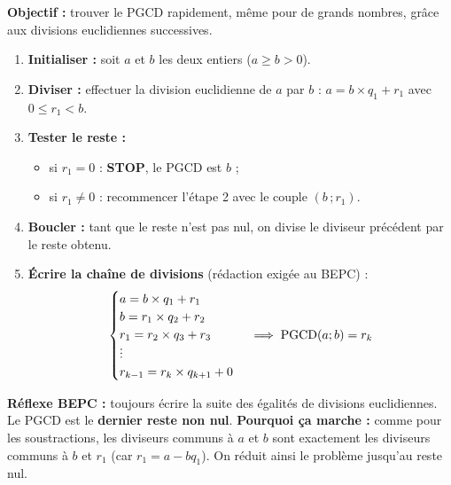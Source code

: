 \documentclass[11pt]{article}
\def\vdots{\mathord{\vbox{\baselineskip3.2pt\lineskiplimit0pt\kern4pt\hbox{.}\hbox{.}\hbox{.}}}}%
\begin{document}
\begin{methode}
\textbf{Objectif :} trouver le PGCD rapidement, même pour de grands nombres, grâce aux divisions euclidiennes successives.
\begin{enumerate}
    \item \textbf{Initialiser :} soit $a$ et $b$ les deux entiers ($a \ge b > 0$).
    \item \textbf{Diviser :} effectuer la division euclidienne de $a$ par $b$ : $a = b \times q_1 + r_1$ avec $0 \le r_1 < b$.
    \item \textbf{Tester le reste :}
    \begin{itemize}
        \item si $r_1 = 0$ : \textbf{STOP}, le PGCD est $b$ ;
        \item si $r_1 \neq 0$ : recommencer l'étape 2 avec le couple $(b \,; r_1)$.
    \end{itemize}
    \item \textbf{Boucler :} tant que le reste n'est pas nul, on divise le diviseur précédent par le reste obtenu.
    \item \textbf{Écrire la chaîne de divisions} (rédaction exigée au BEPC) :
    \[
    \begin{cases}
    a = b \times q_1 + r_1 \\
    b = r_1 \times q_2 + r_2 \\
    r_1 = r_2 \times q_3 + r_3 \\
    \vdots \\
    r_{k-1} = r_k \times q_{k+1} + 0
    \end{cases}
    \implies \text{PGCD}(a; b) = r_k
    \]
\end{enumerate}
\textbf{Réflexe BEPC :} toujours écrire la suite des égalités de divisions euclidiennes. Le PGCD est le \textbf{dernier reste non nul}.
\textbf{Pourquoi ça marche :} comme pour les soustractions, les diviseurs communs à $a$ et $b$ sont exactement les diviseurs communs à $b$ et $r_1$ (car $r_1 = a - b q_1$). On réduit ainsi le problème jusqu'au reste nul.
\end{methode}
\end{document}
